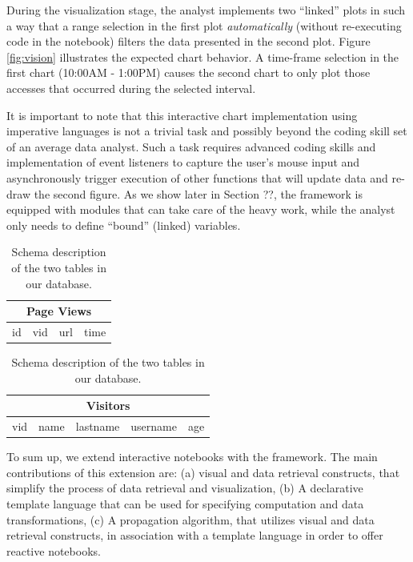 {During the visualization stage, the analyst implements two ``linked'' plots in such a way that a range selection in the first plot \textit{automatically} (without re-executing code in the notebook) filters the data presented in the second plot. Figure \ref{fig:vision} illustrates the expected chart behavior. A time-frame selection in the first chart (10:00AM - 1:00PM) causes the second chart to only plot those accesses that occurred during the selected interval. 

It is important to note that this interactive chart implementation using imperative languages is not a trivial task and possibly beyond the coding skill set of an average data analyst. Such a task requires advanced coding skills and implementation of event listeners to capture the user's mouse input and asynchronously trigger execution of other functions that will update data and re-draw the second figure. As we show later in Section ??, the {\projname} framework is equipped with modules that can take care of the heavy work, while the analyst only needs to define ``bound'' (linked) variables.
}
\begin{table}
\begin{center}

\begin{tabular}{|c|c|c|c|}
\hline 
\multicolumn{4}{|c|}{Page Views} \\ 
\hline 
id & vid & url & time \\ 
\hline 
\end{tabular} 

\hfill

\begin{tabular}{|c|c|c|c|c|}
\hline 
\multicolumn{5}{|c|}{Visitors} \\ 
\hline 
vid & name & lastname & username & age \\ 
\hline 
\end{tabular} 

\end{center}
\caption{Schema description of the two tables in our database.}
\label{tab:schema}
\end{table}


To sum up, we extend interactive notebooks with the  {\projname} framework. The main contributions of this extension are: (a) visual and data retrieval constructs, that simplify the process of data retrieval and visualization, (b) A declarative template language that can be used for specifying computation and data transformations, (c) A propagation algorithm, that utilizes visual and data retrieval constructs, in association with a template language in order to offer reactive notebooks. 

